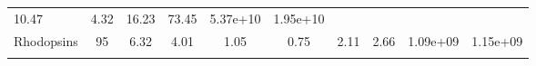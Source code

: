 \documentclass[]{article}
\begin{document}
\begin{longtable}[]{@{}lccccccccc@{}}
\begin{minipage}[t]{0.08\columnwidth}
10.47\strut
\end{minipage} & \begin{minipage}[t]{0.08\columnwidth}\centering\strut
4.32\strut
\end{minipage} & \begin{minipage}[t]{0.08\columnwidth}\centering\strut
16.23\strut
\end{minipage} & \begin{minipage}[t]{0.08\columnwidth}\centering\strut
73.45\strut
\end{minipage} & \begin{minipage}[t]{0.08\columnwidth}\centering\strut
5.37e+10\strut
\end{minipage} & \begin{minipage}[t]{0.08\columnwidth}\centering\strut
1.95e+10\strut
\end{minipage}\tabularnewline
\begin{minipage}[t]{0.07\columnwidth}\raggedright\strut
Rhodopsins\strut
\end{minipage} & \begin{minipage}[t]{0.06\columnwidth}\centering\strut
95\strut
\end{minipage} & \begin{minipage}[t]{0.08\columnwidth}\centering\strut
6.32\strut
\end{minipage} & \begin{minipage}[t]{0.08\columnwidth}\centering\strut
4.01\strut
\end{minipage} & \begin{minipage}[t]{0.08\columnwidth}\centering\strut
1.05\strut
\end{minipage} & \begin{minipage}[t]{0.08\columnwidth}\centering\strut
0.75\strut
\end{minipage} & \begin{minipage}[t]{0.08\columnwidth}\centering\strut
2.11\strut
\end{minipage} & \begin{minipage}[t]{0.08\columnwidth}\centering\strut
2.66\strut
\end{minipage} & \begin{minipage}[t]{0.08\columnwidth}\centering\strut
1.09e+09\strut
\end{minipage} & \begin{minipage}[t]{0.08\columnwidth}\centering\strut
1.15e+09\strut
\end{minipage}\tabularnewline
\begin{minipage}[t]{0.07\columnwidth}\raggedright\strut

\end{minipage}
\end{longtable}
\end{document}

